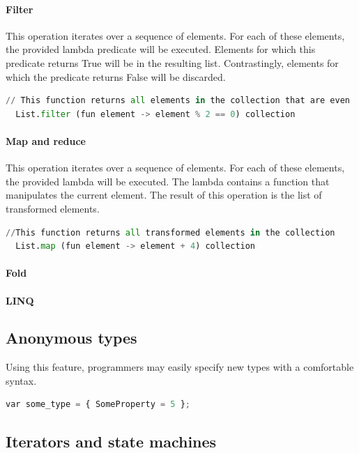 \documentclass{article}
\begin{document}
\paragraph{Filter}
This operation iterates over a sequence of elements. For each of these elements, the provided lambda predicate will be executed.
Elements for which this predicate returns True will be in the resulting list. Contrastingly, elements for which the predicate returns False will be discarded.

\begin{lstlisting}[language=Python]
  // This function returns all elements in the collection that are even
  List.filter (fun element -> element % 2 == 0) collection
\end{lstlisting}

\paragraph{Map and reduce}
This operation iterates over a sequence of elements. For each of these elements, the provided lambda will be executed.
The lambda contains a function that manipulates the current element. The result of this operation is the list of transformed elements.

\begin{lstlisting}[language=Python]
  //This function returns all transformed elements in the collection
  List.map (fun element -> element + 4) collection
\end{lstlisting}
  
\paragraph{Fold}

\paragraph{LINQ}


\subsection{Anonymous types}
Using this feature, programmers may easily specify new types with a comfortable syntax.

\begin{lstlisting}[language=Python]
  var some_type = { SomeProperty = 5 };
\end{lstlisting}

\subsection{Iterators and state machines}
\end{document}
